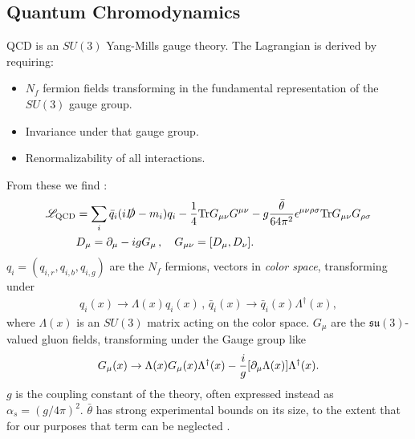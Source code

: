\subsection{Quantum Chromodynamics}
\label{sec:qcd}

QCD is an $SU(3)$ Yang-Mills gauge theory. The Lagrangian is derived by requiring:
\begin{itemize}
\item
  $N_f$ fermion fields transforming in the fundamental representation of the $SU(3)$ gauge group.
\item
  Invariance under that gauge group.
\item
  Renormalizability of all interactions.
\end{itemize}
From these we find \cite{Schwartz:2013pla}:
\begin{align}
  \mathscr{L}_{\text{QCD}} &= \sum_i \bar{q}_i (i \slashed{D} - m_i) q_i - {1\over 4} \text{Tr}G_{\mu\nu} G^{\mu\nu} - g{\bar{\theta}\over 64 \pi^2} \epsilon^{\mu\nu\rho\sigma} \text{Tr}G_{\mu\nu} G_{\rho\sigma} \\
  &D_{\mu} = \partial_{\mu} - i g G_{\mu} \,,\quad
  G_{\mu\nu} = [ D_{\mu}, D_{\nu} ].
  \nonumber
\end{align}
$q_i = ( q_{i,r}, q_{i,b}, q_{i,g} )$ are the $N_f$ fermions, vectors in {\it{color space}}, transforming under
\begin{align}
  q_i(x) \to \Lambda(x)q_i(x) \,,\, \bar{q}_i(x) \to \bar{q}_i(x) \Lambda^{\dagger}(x),
  \label{eq:quark_gauge_trans}
\end{align}
where $\Lambda(x)$ is an $SU(3)$ matrix acting on the color space. $G_{\mu}$ are the $\mathfrak{su}(3)$-valued gluon fields, transforming under the Gauge group like
\begin{align}
  G_{\mu}(x) \to \Lambda(x) G_{\mu}(x) \Lambda^{\dagger}(x) - {i\over g} [ \partial_{\mu} \Lambda(x) ] \Lambda^{\dagger}(x).
  \label{eq:G_gauge_trans}
\end{align}
$g$ is the coupling constant of the theory, often expressed instead as $\alpha_s = (g/4\pi)^2$. $\bar{\theta}$ has strong experimental bounds on its size, to the extent that for our purposes that term can be neglected \cite{ALTAREV1992242}.

